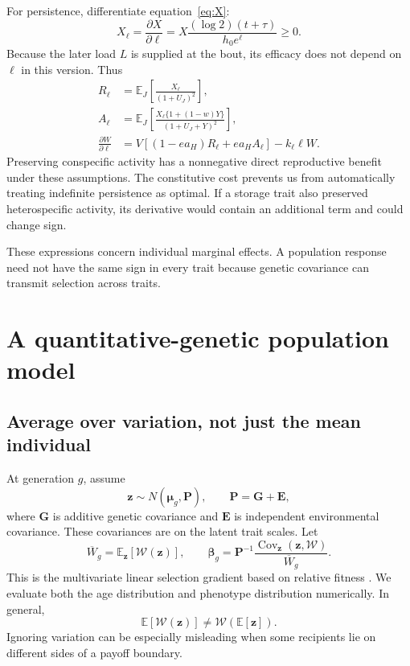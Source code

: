 \documentclass[11pt,a4paper]{article}
\newcommand{\E}{\mathbb E}
\newcommand{\Cov}{\operatorname{Cov}}
\begin{document}
For persistence, differentiate equation~\eqref{eq:X}:
\begin{equation}
X_\ell=\frac{\partial X}{\partial\ell}
=X\frac{(\log2)(t+\tau)}{h_0e^\ell}\geq0.
\end{equation}
Because the later load $L$ is supplied at the bout, its efficacy does not depend on $\ell$ in this version. Thus
\begin{align}
R_\ell&=\E_J\left[\frac{X_\ell}{(1+U_J)^2}\right],\\
A_\ell&=\E_J\left[\frac{X_\ell\{1+(1-w)Y\}}{(1+U_J+Y)^2}\right],\\
\frac{\partial W}{\partial\ell}
&=V\left[(1-ea_H)R_\ell+ea_H A_\ell\right]-k_\ell\ell W.
\end{align}
Preserving conspecific activity has a nonnegative direct reproductive benefit under these assumptions. The constitutive cost prevents us from automatically treating indefinite persistence as optimal. If a storage trait also preserved heterospecific activity, its derivative would contain an additional term and could change sign.

These expressions concern individual marginal effects. A population response need not have the same sign in every trait because genetic covariance can transmit selection across traits.

\section{A quantitative-genetic population model}
\subsection{Average over variation, not just the mean individual}
At generation $g$, assume
\begin{equation}
\mathbf z\sim N(\boldsymbol\mu_g,\mathbf P),\qquad
\mathbf P=\mathbf G+\mathbf E,
\end{equation}
where $\mathbf G$ is additive genetic covariance and $\mathbf E$ is independent environmental covariance. These covariances are on the latent trait scales. Let
\begin{equation}
\overline W_g=\E_{\mathbf z}[\mathcal W(\mathbf z)],\qquad
\boldsymbol\beta_g
=\mathbf P^{-1}\frac{\Cov_{\mathbf z}(\mathbf z,\mathcal W)}{\overline W_g}.
\label{eq:beta}
\end{equation}
This is the multivariate linear selection gradient based on relative fitness \citep{LandeArnold1983}. We evaluate both the age distribution and phenotype distribution numerically. In general,
\begin{equation}
\E[\mathcal W(\mathbf z)]\ne\mathcal W(\E[\mathbf z]).
\end{equation}
Ignoring variation can be especially misleading when some recipients lie on different sides of a payoff boundary.
\end{document}
